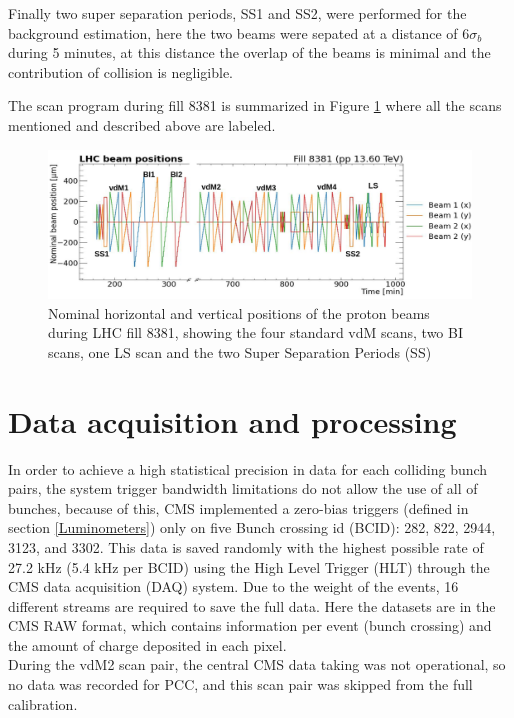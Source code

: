 Finally two super separation periods, SS1 and SS2, were performed for the background estimation, here the two beams were sepated at a distance of $6\sigma_{b}$ during 5 minutes, at this distance the overlap of the beams is minimal and the contribution of collision is negligible.

The scan program during fill 8381 is summarized in Figure \ref{scan_prog} where all the scans mentioned and described above are labeled.

\begin{center}
  \begin{figure}[h]	
    \centering
    \includegraphics[scale=.35]{Chapter4/2022Scanprorgam.png}
    \caption[2022 vdM scan program]{Nominal horizontal and vertical positions of the proton beams during LHC fill 8381, showing the four standard vdM scans, two BI scans, one LS scan and the two Super Separation Periods (SS)}
    \label{scan_prog}
  \end{figure}
\end{center}

\section{Data acquisition and processing}
\label{data}
In order to achieve a high statistical precision in data for each colliding bunch pairs, the system trigger  bandwidth  limitations do not allow the use of all of bunches, because of this, CMS implemented a zero-bias triggers (defined in section \ref{Luminometers}) only on five Bunch crossing id (BCID): 282, 822, 2944, 3123, and 3302. This data is saved randomly with the highest possible rate of 27.2 kHz (5.4 kHz per BCID) using the High Level Trigger (HLT) through the CMS data acquisition (DAQ) system. Due to the weight of the events, 16 different streams are required to save the full data. Here the datasets are in the CMS RAW format, which contains information per event (bunch crossing) and the amount of charge deposited in each pixel.\\ 
During the vdM2 scan pair, the central CMS data taking was not operational, so no data was recorded for PCC, and this scan pair was skipped from the full calibration.\\

